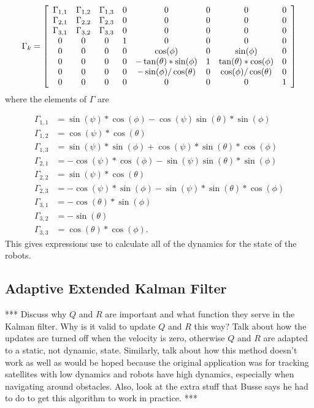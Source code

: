 \begin{align*}
\Gamma_k = \left[\begin{array}{c c c c c c c c}
\Gamma_{1,1} & \Gamma_{1,2} & \Gamma_{1,3} & 0 & 0 & 0 & 0 & 0 \\
\Gamma_{2,1} & \Gamma_{2,2} & \Gamma_{2,3} & 0 & 0 & 0 & 0 & 0 \\
\Gamma_{3,1} & \Gamma_{3,2} & \Gamma_{3,3} & 0 & 0 & 0 & 0 & 0 \\
0 & 0 & 0 & 1 & 0 & 0 & 0 & 0 \\
0 & 0 & 0 & 0 & \cos(\phi) & 0 & \sin(\phi) & 0 \\
0 & 0 & 0 & 0 & -\tan(\theta)*\sin(\phi) & 1 & \tan(\theta)*\cos(\phi) & 0 \\
0 & 0 & 0 & 0 & -\sin(\phi) / \cos(\theta) & 0 & \cos(\phi)/\cos(\theta) & 0 \\
0 & 0 & 0 & 0 & 0 & 0 & 0 & 1
\end{array}\right]
\end{align*}
where the elements of $\Gamma$ are

\begin{align*}
\Gamma_{1,1} &= \sin(\psi)*\cos(\phi)-\cos(\psi)\sin(\theta)*\sin(\phi) \\
\Gamma_{1,2} &= \cos(\psi)*\cos(\theta) \\
\Gamma_{1,3} &= \sin(\psi)*\sin(\phi)+\cos(\psi)*\sin(\theta)*\cos(\phi) \\
\Gamma_{2,1} &= -\cos(\psi)*\cos(\phi)-\sin(\psi)\sin(\theta)*\sin(\phi) \\
\Gamma_{2,2} &= \sin(\psi)*\cos(\theta) \\
\Gamma_{2,3} &= -\cos(\psi)*\sin(\phi)-\sin(\psi)*\sin(\theta)*\cos(\phi) \\
\Gamma_{3,1} &= -\cos(\theta)*\sin(\phi) \\
\Gamma_{3,2} &= -\sin(\theta) \\
\Gamma_{3,3} &= \cos(\theta)*\cos(\phi).
\end{align*}
This gives expressions use to calculate all of the dynamics for the state of the robots.

\subsection{Adaptive Extended Kalman Filter}
\label{sec:adaptiveekf}
*** Discuss why $Q$ and $R$ are important and what function they serve in the Kalman filter. Why is it valid to update $Q$ and $R$ this way? Talk about how the updates are turned off when the velocity is zero, otherwise $Q$ and $R$ are adapted to a static, not dynamic, state. Similarly, talk about how this method doesn't work as well as would be hoped because the original application was for tracking satellites with low dynamics and robots have high dynamics, especially when navigating around obstacles. Also, look at the extra stuff that Busse says he had to do to get this algorithm to work in practice. ***

